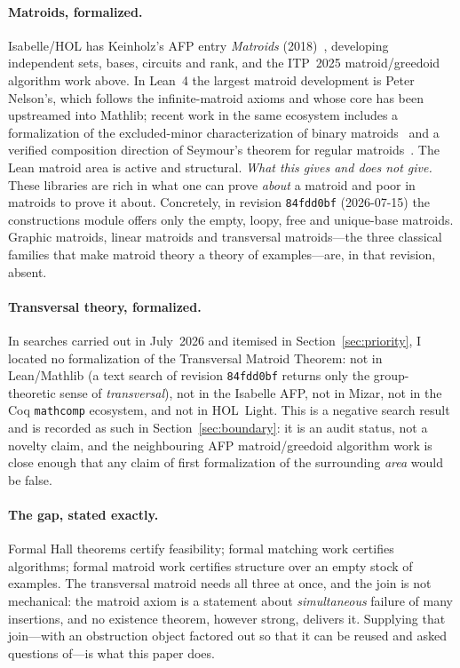 \documentclass[11pt]{article}
\newcommand{\lean}[1]{\texttt{#1}}
\begin{document}
\paragraph{Matroids, formalized.} Isabelle/HOL has Keinholz's AFP entry \emph{Matroids}
(2018)~\cite{afpmatroids}, developing independent sets, bases, circuits and rank, and the ITP~2025
matroid/greedoid algorithm work above. In Lean~4 the
largest matroid development is Peter Nelson's, which follows the infinite-matroid axioms and whose
core has been upstreamed into Mathlib; recent work in the same ecosystem includes a formalization
of the excluded-minor characterization of binary matroids~\cite{binarymatroids} and a verified
composition direction of Seymour's theorem for regular matroids~\cite{seymour}. The Lean matroid
area is active and structural. \emph{What this gives and does not give.} These libraries are rich
in what one can prove \emph{about} a matroid and poor in matroids to prove it about. Concretely,
in revision \lean{84fdd0bf} (2026-07-15) the constructions module offers only the empty, loopy,
free and unique-base matroids. Graphic matroids, linear matroids and transversal matroids---the
three classical families that make matroid theory a theory of examples---are, in that revision,
absent.

\paragraph{Transversal theory, formalized.} In searches carried out in July~2026 and itemised in
Section~\ref{sec:priority}, I located no formalization of the Transversal Matroid Theorem: not in
Lean/Mathlib (a text search of revision \lean{84fdd0bf} returns only the group-theoretic sense of
\emph{transversal}), not in the Isabelle AFP, not in Mizar, not in the Coq \lean{mathcomp}
ecosystem, and not in HOL~Light. This is
a negative search result and is recorded as such in Section~\ref{sec:boundary}: it is an audit
status, not a novelty claim, and the neighbouring AFP matroid/greedoid algorithm work is close
enough that any claim of first formalization of the surrounding \emph{area} would be false.

\paragraph{The gap, stated exactly.} Formal Hall theorems certify feasibility; formal matching
work certifies algorithms; formal matroid work certifies structure over an empty stock of
examples. The transversal matroid needs all three at once, and the join is not mechanical: the
matroid axiom is a statement about \emph{simultaneous} failure of many insertions, and no
existence theorem, however strong, delivers it. Supplying that join---with an obstruction object
factored out so that it can be reused and asked questions of---is what this paper does.
\end{document}
